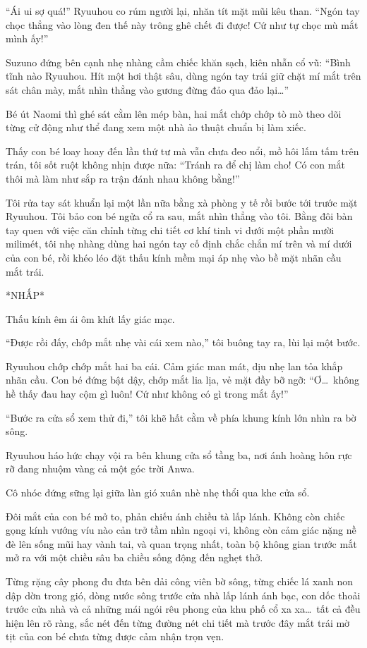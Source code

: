 \documentclass[../main.tex]{subfiles}
\begin{document}
``Ái ui sợ quá!'' Ryuuhou co rúm người lại, nhăn tít mặt mũi kêu than. ``Ngón tay chọc thẳng vào lòng đen thế này trông ghê chết đi được! Cứ như tự chọc mù mắt mình ấy!''

Suzuno đứng bên cạnh nhẹ nhàng cầm chiếc khăn sạch, kiên nhẫn cổ vũ: ``Bình tĩnh nào Ryuuhou. Hít một hơi thật sâu, dùng ngón tay trái giữ chặt mí mắt trên sát chân mày, mắt nhìn thẳng vào gương đừng đảo qua đảo lại\dots''

Bé út Naomi thì ghé sát cằm lên mép bàn, hai mắt chớp chớp tò mò theo dõi từng cử động như thể đang xem một nhà ảo thuật chuẩn bị làm xiếc.

Thấy con bé loay hoay đến lần thứ tư mà vẫn chưa đeo nổi, mồ hôi lấm tấm trên trán, tôi sốt ruột không nhịn được nữa: ``Tránh ra để chị làm cho! Có con mắt thôi mà làm như sắp ra trận đánh nhau không bằng!''

Tôi rửa tay sát khuẩn lại một lần nữa bằng xà phòng y tế rồi bước tới trước mặt Ryuuhou. Tôi bảo con bé ngửa cổ ra sau, mắt nhìn thẳng vào tôi. Bằng đôi bàn tay quen với việc căn chỉnh từng chi tiết cơ khí tinh vi dưới một phần mười milimét, tôi nhẹ nhàng dùng hai ngón tay cố định chắc chắn mí trên và mí dưới của con bé, rồi khéo léo đặt thấu kính mềm mại áp nhẹ vào bề mặt nhãn cầu mắt trái.

*NHẤP*

Thấu kính êm ái ôm khít lấy giác mạc.

``Được rồi đấy, chớp mắt nhẹ vài cái xem nào,'' tôi buông tay ra, lùi lại một bước.

Ryuuhou chớp chớp mắt hai ba cái. Cảm giác man mát, dịu nhẹ lan tỏa khắp nhãn cầu. Con bé đứng bật dậy, chớp mắt lia lịa, vẻ mặt đầy bỡ ngỡ: ``Ơ\dots\ không hề thấy đau hay cộm gì luôn! Cứ như không có gì trong mắt ấy!''

``Bước ra cửa sổ xem thử đi,'' tôi khẽ hất cằm về phía khung kính lớn nhìn ra bờ sông.

Ryuuhou háo hức chạy vội ra bên khung cửa sổ tầng ba, nơi ánh hoàng hôn rực rỡ đang nhuộm vàng cả một góc trời Anwa.

Cô nhóc đứng sững lại giữa làn gió xuân nhè nhẹ thổi qua khe cửa sổ.

Đôi mắt của con bé mở to, phản chiếu ánh chiều tà lấp lánh. Không còn chiếc gọng kính vướng víu nào cản trở tầm nhìn ngoại vi, không còn cảm giác nặng nề đè lên sống mũi hay vành tai, và quan trọng nhất, toàn bộ không gian trước mắt mở ra với một chiều sâu ba chiều sống động đến nghẹt thở.

Từng rặng cây phong đu đưa bên dải công viên bờ sông, từng chiếc lá xanh non dập dờn trong gió, dòng nước sông trước cửa nhà lấp lánh ánh bạc, con dốc thoải trước cửa nhà và cả những mái ngói rêu phong của khu phố cổ xa xa\dots\ tất cả đều hiện lên rõ ràng, sắc nét đến từng đường nét chi tiết mà trước đây mắt trái mờ tịt của con bé chưa từng được cảm nhận trọn vẹn.
\end{document}
